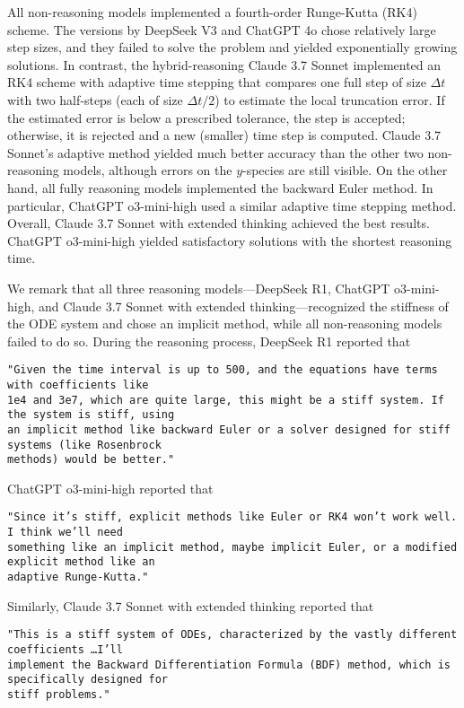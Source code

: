 \documentclass{article}
\begin{document}
All non-reasoning models implemented a fourth-order Runge-Kutta (RK4) scheme. The versions by DeepSeek V3 and ChatGPT 4o chose relatively large step sizes, and they failed to solve the problem and yielded exponentially growing solutions. In contrast, the hybrid-reasoning Claude 3.7 Sonnet implemented an RK4 scheme with adaptive time stepping that compares one full step of size $\Delta t$ with two half‑steps (each of size $\Delta t /2$) to estimate the local truncation error. If the estimated error is below a prescribed tolerance, the step is accepted; otherwise, it is rejected and a new (smaller) time step is computed. Claude 3.7 Sonnet's adaptive method yielded much better accuracy than the other two non-reasoning models, although errors on the $y$-species are still visible. On the other hand, all fully reasoning models implemented the backward Euler method. In particular, ChatGPT o3-mini-high used a similar adaptive time stepping method. Overall, Claude 3.7 Sonnet with extended thinking achieved the best results. ChatGPT o3-mini-high yielded satisfactory solutions with the shortest reasoning time. 

We remark that all three reasoning models—DeepSeek R1,  ChatGPT o3-mini-high, and Claude 3.7 Sonnet with extended thinking—recognized the stiffness of the ODE system and chose an implicit method, while all non-reasoning models failed to do so. During the reasoning process, DeepSeek R1 reported that 

\texttt{"Given the time interval is up to 500, and the equations have terms with coefficients like \\ 1e4 and 3e7, which are quite large, this might be a stiff system. If the system is stiff, using \\ an implicit method like backward Euler or a solver designed for stiff systems (like Rosenbrock \\ methods) would be better."}

ChatGPT o3-mini-high reported that 

\texttt{"Since it's stiff, explicit methods like Euler or RK4 won't work well. I think we'll need \\ something like an implicit method, maybe implicit Euler, or a modified explicit method like an \\ adaptive Runge-Kutta."}

Similarly, Claude 3.7 Sonnet with extended thinking reported that 

\texttt{"This is a stiff system of ODEs, characterized by the vastly different coefficients \ldots I'll \\ implement the Backward Differentiation Formula (BDF) method, which is specifically designed for \\ stiff problems." }
\end{document}
